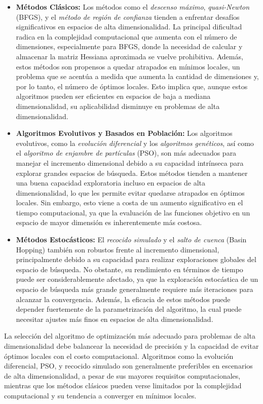\documentclass[fontsize=10pt]{article}
\begin{document}
\begin{itemize}
    \item \textbf{Métodos Clásicos:}
    Los métodos como el \textit{descenso máximo}, \textit{quasi-Newton} (BFGS), y el \textit{método de región de confianza} tienden a enfrentar desafíos significativos en espacios de alta dimensionalidad. La principal dificultad radica en la complejidad computacional que aumenta con el número de dimensiones, especialmente para BFGS, donde la necesidad de calcular y almacenar la matriz Hessiana aproximada se vuelve prohibitiva. Además, estos métodos son propensos a quedar atrapados en mínimos locales, un problema que se acentúa a medida que aumenta la cantidad de dimensiones y, por lo tanto, el número de óptimos locales. Esto implica que, aunque estos algoritmos pueden ser eficientes en espacios de baja a mediana dimensionalidad, su aplicabilidad disminuye en problemas de alta dimensionalidad.
    \item \textbf{Algoritmos Evolutivos y Basados en Población:}
    Los algoritmos evolutivos, como la \textit{evolución diferencial} y los \textit{algoritmos genéticos}, así como el \textit{algoritmo de enjambre de partículas} (PSO), son más adecuados para manejar el incremento dimensional debido a su capacidad intrínseca para explorar grandes espacios de búsqueda. Estos métodos tienden a mantener una buena capacidad exploratoria incluso en espacios de alta dimensionalidad, lo que les permite evitar quedarse atrapados en óptimos locales. Sin embargo, esto viene a costa de un aumento significativo en el tiempo computacional, ya que la evaluación de las funciones objetivo en un espacio de mayor dimensión es inherentemente más costosa.
    \item \textbf{Métodos Estocásticos:}
    El \textit{recocido simulado} y el \textit{salto de cuenca} (Basin Hopping) también son robustos frente al incremento dimensional, principalmente debido a su capacidad para realizar exploraciones globales del espacio de búsqueda. No obstante, su rendimiento en términos de tiempo puede ser considerablemente afectado, ya que la exploración estocástica de un espacio de búsqueda más grande generalmente requiere más iteraciones para alcanzar la convergencia. Además, la eficacia de estos métodos puede depender fuertemente de la parametrización del algoritmo, la cual puede necesitar ajustes más finos en espacios de alta dimensionalidad.
    
\end{itemize}

La selección del algoritmo de optimización más adecuado para problemas de alta dimensionalidad debe balancear la necesidad de precisión y la capacidad de evitar óptimos locales con el costo computacional. Algoritmos como la evolución diferencial, PSO, y recocido simulado son generalmente preferibles en escenarios de alta dimensionalidad, a pesar de sus mayores requisitos computacionales, mientras que los métodos clásicos pueden verse limitados por la complejidad computacional y su tendencia a converger en mínimos locales.
\end{document}
